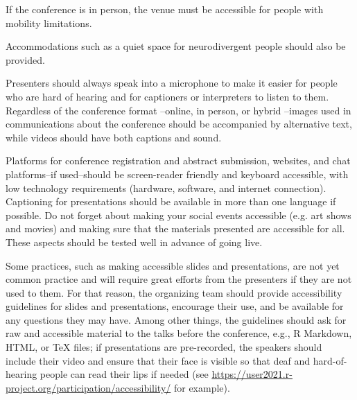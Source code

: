 \documentclass[10pt,letterpaper]{article}
\begin{document}
If the conference is in person, the venue must be accessible for people with mobility limitations. 


Accommodations such as a quiet space for neurodivergent people should also be provided.

Presenters should always speak into a microphone to make it easier for people who are hard of hearing and for captioners or interpreters to listen to them. 
Regardless of the conference format --online, in person, or hybrid --images used in communications about the conference should be accompanied by alternative text, while videos should have both captions and sound. 

Platforms for conference registration and abstract submission, websites, and chat platforms--if used--should be screen-reader friendly and keyboard accessible, with low technology requirements (hardware, software, and internet connection). 
Captioning for presentations should be available in more than one language if possible.
Do not forget about making your social events accessible (e.g. art shows and movies) and making sure that the materials presented are accessible for all. 
These aspects should be tested well in advance of going live.  

Some practices, such as making accessible slides and presentations, are not yet common practice and will require great efforts from the presenters if they are not used to them. 
For that reason, the organizing team should provide accessibility guidelines for slides and presentations, encourage their use, and be available for any questions they may have.  
Among other things, the guidelines should ask for raw and accessible material to the talks before the conference, e.g., R Markdown, HTML, or \TeX{} files; if presentations are pre-recorded, the speakers should include their video and ensure that their face is visible so that deaf and hard-of-hearing people can read their lips if needed (see \url{https://user2021.r-project.org/participation/accessibility/} for example). 
\end{document}
